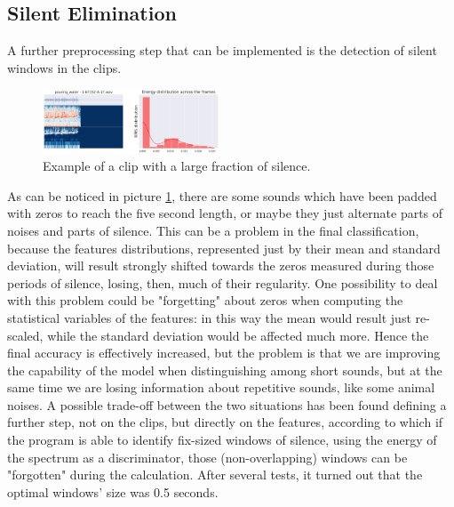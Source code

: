 \subsection{Silent Elimination}
\label{sec:windowing}
A further preprocessing step that can be implemented is the detection of silent windows in the clips.
\begin{figure}[!h] 
	\centering
	\includegraphics[width=0.47\textwidth]{pictures/silent_ex.pdf}
	\caption{Example of a clip with a large fraction of silence.}
	\label{fig:silent_ex}
\end{figure}
As can be noticed in picture \ref{fig:silent_ex}, there are some sounds which have been padded with zeros to reach the five second length, or maybe they just alternate parts of noises and parts of silence. This can be a problem in the final classification, because the features distributions, represented just by their mean and standard deviation, will result strongly shifted towards the zeros measured during those periods of silence, losing, then, much of their regularity. One possibility to deal with this problem could be "forgetting" about zeros when computing the statistical variables of the features: in this way the mean would result just re-scaled, while the standard deviation would be affected much more. Hence the final accuracy is effectively increased, but the problem is that we are improving the capability of the model when distinguishing among short sounds, but at the same time we are losing information about repetitive sounds, like some animal noises. A possible trade-off between the two situations has been found defining a further step, not on the clips, but directly on the features, according to which if the program is able to identify fix-sized windows of silence, using the energy of the spectrum as a discriminator, those (non-overlapping) windows can be "forgotten" during the calculation. After several tests, it turned out that the optimal windows' size was 0.5 seconds.

